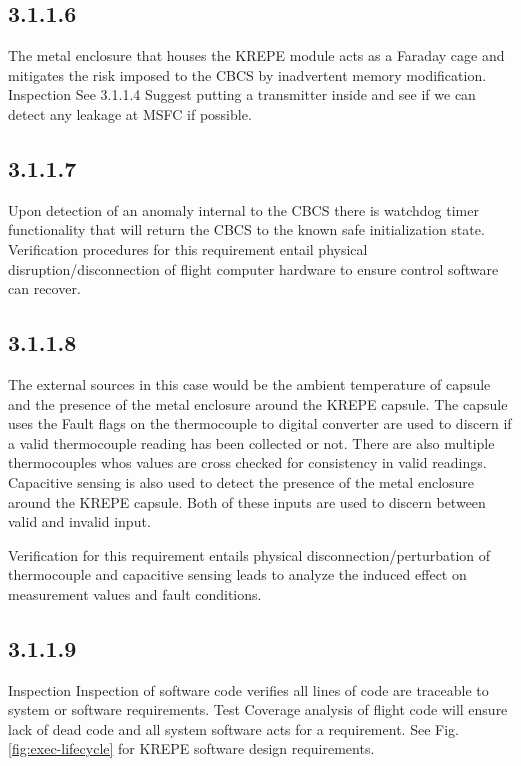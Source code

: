 \documentclass{article}
\begin{document}
\subsection{3.1.1.6}
The metal enclosure that houses the KREPE module acts as a Faraday cage and mitigates the risk imposed to the CBCS by inadvertent memory modification.
Inspection
See 3.1.1.4
Suggest putting a transmitter inside and see if we can detect any leakage at MSFC if possible.
\subsection{3.1.1.7}
Upon detection of an anomaly internal to the CBCS there is watchdog timer functionality that will return the CBCS to the known safe initialization state. Verification procedures for this requirement entail physical disruption/disconnection of flight computer hardware to ensure control software can recover.

\subsection{3.1.1.8}
The external sources in this case would be the ambient temperature of capsule and the presence of the metal enclosure around the KREPE capsule. The capsule uses the Fault flags on the thermocouple to digital converter are used to discern if a valid thermocouple reading has been collected or not. There are also multiple thermocouples whos values are cross checked for consistency in valid readings. Capacitive sensing is also used to detect the presence of the metal enclosure around the KREPE capsule. Both of these inputs are used to discern between valid and invalid input.

Verification for this requirement entails physical disconnection/perturbation of thermocouple and capacitive sensing leads to analyze the induced effect on measurement values and fault conditions. 

\subsection{3.1.1.9}
Inspection
Inspection of software code verifies all lines of code are traceable to system or software requirements.
Test
Coverage analysis of flight code will ensure lack of dead code and all system software acts for a requirement.
See Fig. \ref{fig:exec-lifecycle} for KREPE software design requirements.
\end{document}
